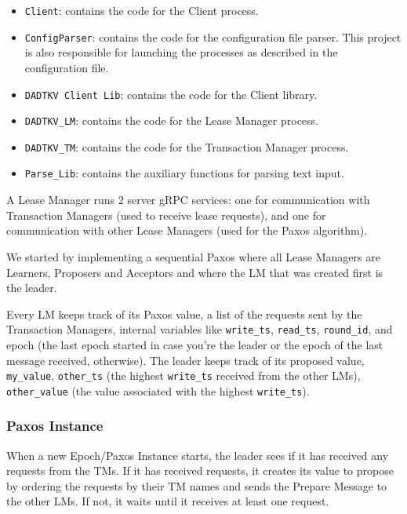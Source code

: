 \documentclass[times, 10pt,twocolumn]{article}
\begin{document}
\begin{itemize}
      \item \texttt{Client}: contains the code for the Client process.
      \item \texttt{ConfigParser}: contains the code for the configuration file parser. This project is also responsible for launching the processes as described in the configuration file.
      \item \texttt{DADTKV Client Lib}: contains the code for the Client library.
      \item \texttt{DADTKV\_LM}: contains the code for the Lease Manager process.
      \item \texttt{DADTKV\_TM}: contains the code for the Transaction Manager process.
      \item \texttt{Parse\_Lib}: contains the auxiliary functions for parsing text input.
\end{itemize}


A Lease Manager runs 2 server gRPC services: one for communication with Transaction Managers (used to receive lease requests), and one for communication with other Lease Managers (used for the Paxos algorithm).


We started by implementing a sequential Paxos where all Lease Managers are Learners, Proposers and Acceptors and where the LM that was created first is the leader.

Every LM keeps track of its Paxos value, a list of the requests sent by the Transaction Managers, internal variables like \texttt{write\_ts}, \texttt{read\_ts}, \texttt{round\_id}, and epoch (the last epoch started in case you're the leader or the epoch of the last message received, otherwise).
The leader keeps track of its proposed value, \texttt{my\_value}, \texttt{other\_ts} (the highest \texttt{write\_ts} received from the other LMs), \texttt{other\_value} (the value associated with the highest \texttt{write\_ts}).

\subsubsection{Paxos Instance}

When a new Epoch/Paxos Instance starts, the leader sees if it has received any requests from the TMs.
If it has received requests, it creates its value to propose by ordering the requests by their TM names and sends the Prepare Message to the other LMs.
If not, it waits until it receives at least one request.
\end{document}

